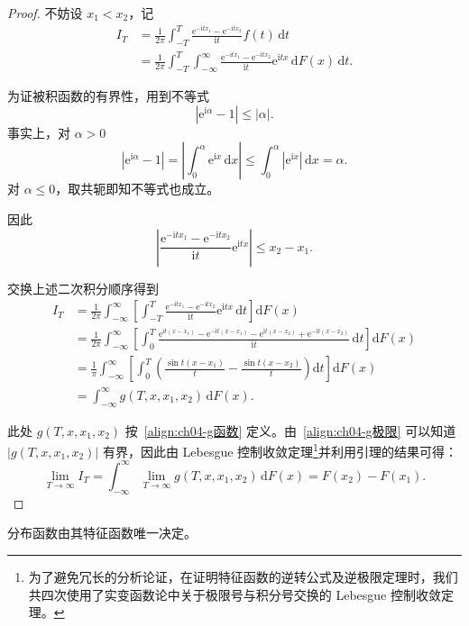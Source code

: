 \documentclass[../../main.tex]{subfiles}
\begin{document}
\begin{proof}
不妨设 $x_1<x_2$，记
\begin{align*}
I_T&=\frac{1}{2\pi}\int_{-T}^T\frac{\mathrm{e}^{-\mathrm{i}tx_1}-\mathrm{e}^{-\mathrm{i}tx_2}}{\mathrm{i}t}f(t)\,\mathrm{d}t\\
&=\frac{1}{2\pi}\int_{-T}^T\int_{-\infty}^{\infty}\frac{\mathrm{e}^{-\mathrm{i}tx_1}-\mathrm{e}^{-\mathrm{i}tx_2}}{\mathrm{i}t}\mathrm{e}^{\mathrm{i}tx}\,\mathrm{d}F(x)\,\mathrm{d}t.
\end{align*}

为证被积函数的有界性，用到不等式
\[
|\mathrm{e}^{\mathrm{i}\alpha}-1|\leqslant|\alpha|.
\]
事实上，对 $\alpha>0$
\[
|\mathrm{e}^{\mathrm{i}\alpha}-1|=\left|\int_0^\alpha\mathrm{e}^{\mathrm{i}x}\,\mathrm{d}x\right|\leqslant\int_0^\alpha|\mathrm{e}^{\mathrm{i}x}|\,\mathrm{d}x=\alpha.
\]
对 $\alpha\leqslant 0$，取共轭即知不等式也成立。

因此
\[
\left|\frac{\mathrm{e}^{-\mathrm{i}tx_1}-\mathrm{e}^{-\mathrm{i}tx_2}}{\mathrm{i}t}\mathrm{e}^{\mathrm{i}tx}\right|\leqslant x_2-x_1.
\]

交换上述二次积分顺序得到
\begin{align*}
I_T&=\frac{1}{2\pi}\int_{-\infty}^{\infty}\left[\int_{-T}^T\frac{\mathrm{e}^{-\mathrm{i}tx_1}-\mathrm{e}^{-\mathrm{i}tx_2}}{\mathrm{i}t}\mathrm{e}^{\mathrm{i}tx}\,\mathrm{d}t\right]\mathrm{d}F(x)\\
&=\frac{1}{2\pi}\int_{-\infty}^{\infty}\left[\int_0^T\frac{\mathrm{e}^{\mathrm{i}t(x-x_1)}-\mathrm{e}^{-\mathrm{i}t(x-x_1)}-\mathrm{e}^{\mathrm{i}t(x-x_2)}+\mathrm{e}^{-\mathrm{i}t(x-x_2)}}{\mathrm{i}t}\,\mathrm{d}t\right]\mathrm{d}F(x)\\
&=\frac1\pi\int_{-\infty}^{\infty}\left[\int_0^T\left(\frac{\sin t(x-x_1)}{t}-\frac{\sin t(x-x_2)}{t}\right)\mathrm{d}t\right]\mathrm{d}F(x)\\
&=\int_{-\infty}^{\infty}g(T,x,x_1,x_2)\,\mathrm{d}F(x).
\end{align*}

此处 $g(T,x,x_1,x_2)$ 按~\eqref{align:ch04-g函数} 定义。由~\eqref{align:ch04-g极限} 可以知道 $|g(T,x,x_1,x_2)|$ 有界，因此由 Lebesgue 控制收敛定理\footnote{为了避免冗长的分析论证，在证明特征函数的逆转公式及逆极限定理时，我们共四次使用了实变函数论中关于极限号与积分号交换的 Lebesgue 控制收敛定理。}并利用引理的结果可得：
\[
\lim_{T\to\infty}I_T=\int_{-\infty}^{\infty}\lim_{T\to\infty}g(T,x,x_1,x_2)\,\mathrm{d}F(x)
=F(x_2)-F(x_1).
\]
\end{proof}

\begin{theorem}[唯一性定理]\label{theorem:ch04-特征函数唯一性}
分布函数由其特征函数唯一决定。
\end{theorem}
\end{document}
